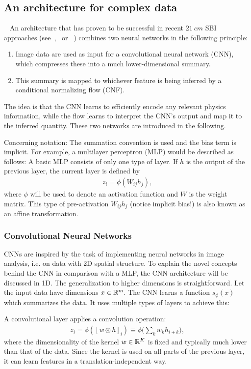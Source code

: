 \subsection{An architecture for complex data}~\label{subsec:architecture}
An architecture that has proven to be successful in recent $21~\si{cm}$ SBI approaches (see~\cite{heneka_2022},~\cite{Pietschke_2025} or ~\cite{Schosser_2026}) combines two neural networks in the following principle:
\begin{enumerate}
    \item   Image data are used as input for a convolutional neural network (CNN), which compresses these into a much lower-dimensional summary.
    \item   This summary is mapped to whichever feature is being inferred by a conditional normalizing flow (CNF).
\end{enumerate}
The idea is that the CNN learns to efficiently encode any relevant physics information, while the flow learns to interpret the CNN's output and map it to the inferred quantity. These two networks are introduced in the following. 

Concerning notation: The summation convention is used and the bias term is implicit. For example, a multilayer perceptron (MLP) would be described as follows: A basic MLP consists of only one type of layer. If $h$ is the output of the previous layer, the current layer is defined by
\begin{align}
    z_i = \phi(W_{ij} h_j),
\end{align}
where $\phi$ will be used to denote an activation function and $W$ is the weight matrix. This type of pre-activation $W_{ij} h_j$ (notice implicit bias!) is also known as an affine transformation.

\subsubsection*{Convolutional Neural Networks}
CNNs are inspired by the task of implementing neural networks in image analysis, i.e. on data with 2D spatial structure. To explain the novel concepts behind the CNN in comparison with a MLP, the CNN architecture will be discussed in 1D. The generalization to higher dimensions is straightforward. Let the input data have dimensions $x \in \mathbb{R}^m$. The CNN learns a function $s_\phi(x)$ which summarizes the data. It uses multiple types of layers to achieve this:

A convolutional layer applies a convolution operation:
\begin{align}
    z_i = \phi(\left[w \circledast h\right]_i) \equiv \phi\biggl(\sum_k w_k h_{i+k}\biggr),
\end{align}
where the dimensionality of the kernel $w\in \mathbb{R}^K$ is fixed and typically much lower than that of the data. Since the kernel is used on all parts of the previous layer, it can learn features in a translation-independent way.

